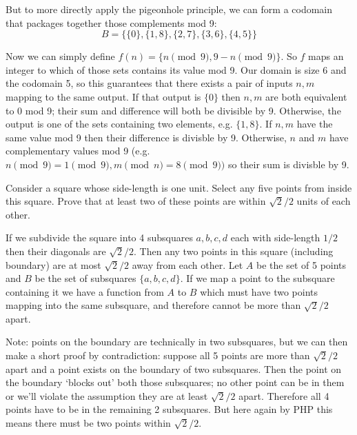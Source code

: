 \documentclass{article}
\begin{document}
But to more directly apply the pigeonhole principle, we can form a codomain that packages together those complements mod 9:
$$B = \{\{0\}, \{1, 8\}, \{2, 7\}, \{3, 6\}, \{4, 5\}\}$$

Now we can simply define $f(n) = \{n \pmod{9}, 9 - n \pmod{9}\}$. So $f$ maps an integer to which of those sets contains its value mod 9. Our domain is size 6 and the codomain 5, so this guarantees that there exists a pair of inputs $n, m$ mapping to the same output. If that output is $\{0\}$ then $n, m$ are both equivalent to 0 mod 9; their sum and difference will both be divisible by 9. Otherwise, the output is one of the sets containing two elements, e.g. $\{1, 8\}$. If $n, m$ have the same value mod 9 then their difference is divisble by 9. Otherwise, $n$ and $m$ have complementary values mod 9 (e.g. $n \pmod{9} = 1 \pmod{9}, m \pmod{n} = 8 \pmod{9})$ so their sum is divisble by 9.

\begin{problem}
Consider a square whose side-length is one unit. Select any five points from inside this square. Prove that at least two of these points are within $\sqrt{2}/2$ units of each other.
\end{problem}

If we subdivide the square into 4 subsquares $a, b, c, d$ each with side-length $1/2$ then their diagonals are $\sqrt{2}/2$. Then any two points in this square (including boundary) are at most $\sqrt{2}/2$ away from each other. Let $A$ be the set of 5 points and $B$ be the set of subsquares $\{a, b, c, d\}$. If we map a point to the subsquare containing it we have a function from $A$ to $B$ which must have two points mapping into the same subsquare, and therefore cannot be more than $\sqrt{2}/2$ apart.

Note: points on the boundary are technically in two subsquares, but we can then make a short proof by contradiction: suppose all 5 points are more than $\sqrt{2}/2$ apart and a point exists on the boundary of two subsquares. Then the point on the boundary `blocks out' both those subsquares; no other point can be in them or we'll violate the assumption they are at least $\sqrt{2}/2$ apart. Therefore all 4 points have to be in the remaining 2 subsquares. But here again by PHP this means there must be two points within $\sqrt{2}/2$.
\begin{center}

\end{center}
\end{document}

